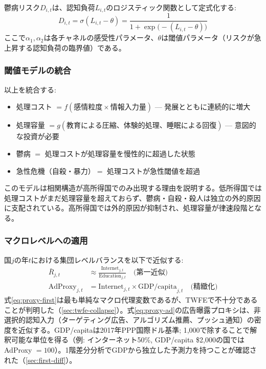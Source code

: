 \documentclass[a4paper,11pt,titlepage]{article}
\newcommand{\balanceL}{L}
\begin{document}
鬱病リスク$D_{i,t}$は、認知負荷$\balanceL_{i,t}$のロジスティック関数として定式化する:
\begin{equation}\label{eq:logistic}
  D_{i,t} = \sigma(\balanceL_{i,t} - \theta)
  = \frac{1}{1 + \exp\bigl(-(\balanceL_{i,t} - \theta)\bigr)}
\end{equation}
ここで$\alpha_1, \alpha_2$は各チャネルの感受性パラメータ、$\theta$は閾値パラメータ（リスクが急上昇する認知負荷の臨界値）である。

\subsubsection{閾値モデルの統合}

以上を統合する:
\begin{itemize}
  \item 処理コスト $= f(\text{感情粒度} \times \text{情報入力量})$ --- 発展とともに連続的に増大
  \item 処理容量 $= g(\text{教育による圧縮、体験的処理、睡眠による回復})$ --- 意図的な投資が必要
  \item 鬱病 $=$ 処理コストが処理容量を慢性的に超過した状態
  \item 急性危機（自殺・暴力）$=$ 処理コストが急性閾値を超過
\end{itemize}
このモデルは相関構造が高所得国でのみ出現する理由を説明する。低所得国では処理コストがまだ処理容量を超えておらず、鬱病・自殺・殺人は独立の外的原因に支配されている。高所得国では外的原因が抑制され、処理容量が律速段階となる。

\subsubsection{マクロレベルへの適用}

国$j$の年$t$における集団レベルバランスを以下で近似する:
\begin{align}
  \bar{R}_{j,t} &\approx \frac{\text{Internet}_{j,t}}{\text{Education}_{j,t}}
  \quad\text{(第一近似)} \label{eq:proxy-first} \\
  \text{AdProxy}_{j,t} &= \text{Internet}_{j,t} \times \text{GDP/capita}_{j,t}
  \quad\text{(精緻化)} \label{eq:proxy-ad}
\end{align}
式\eqref{eq:proxy-first}は最も単純なマクロ代理変数であるが、TWFEで不十分であることが判明した（\cref{sec:twfe-collapse}）。式\eqref{eq:proxy-ad}の広告曝露プロキシは、非選択的認知入力（ターゲティング広告、アルゴリズム推薦、プッシュ通知）の密度を近似する。GDP/capitaは2017年PPP国際ドル基準; 1,000で除することで解釈可能な単位を得る（例: インターネット50\%, GDP/capita \$2,000の国ではAdProxy $= 100$）。1階差分分析でGDPから独立した予測力を持つことが確認された（\cref{sec:first-diff}）。
\end{document}
